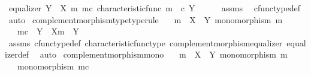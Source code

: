 \begin{isabellebody}
\ {\isachardoublequoteopen}equalizer\ {\isacharparenleft}{\kern0pt}Y\ {\isasymsetminus}\ {\isacharparenleft}{\kern0pt}X{\isacharcomma}{\kern0pt}\ m{\isacharparenright}{\kern0pt}{\isacharparenright}{\kern0pt}\ m\isactrlsup c\ {\isacharparenleft}{\kern0pt}characteristic{\isacharunderscore}{\kern0pt}func\ m{\isacharparenright}{\kern0pt}\ {\isacharparenleft}{\kern0pt}{\isasymf}\ {\isasymcirc}\isactrlsub c\ {\isasymbeta}\isactrlbsub Y\isactrlesub {\isacharparenright}{\kern0pt}{\isachardoublequoteclose}\isanewline
\ \ \ \ \isamarkupfalse%
\ assms\ \isamarkupfalse%
\ cfunc{\isacharunderscore}{\kern0pt}type{\isacharunderscore}{\kern0pt}def\ \isamarkupfalse%
\ auto\isanewline
{}\isamarkupfalse%
%
\endisatagproof
{\isafoldproof}%
%
\isadelimproof
\isanewline
%
\endisadelimproof
\isanewline
{}\isamarkupfalse%
\ complement{\isacharunderscore}{\kern0pt}morphism{\isacharunderscore}{\kern0pt}type{\isacharbrackleft}{\kern0pt}type{\isacharunderscore}{\kern0pt}rule{\isacharbrackright}{\kern0pt}{\isacharcolon}{\kern0pt}\isanewline
\ \ \ {\isachardoublequoteopen}m\ {\isacharcolon}{\kern0pt}\ X\ {\isasymrightarrow}\ Y{\isachardoublequoteclose}\ {\isachardoublequoteopen}monomorphism\ m{\isachardoublequoteclose}\isanewline
\ \ \ {\isachardoublequoteopen}m\isactrlsup c\ {\isacharcolon}{\kern0pt}\ Y\ {\isasymsetminus}\ {\isacharparenleft}{\kern0pt}X{\isacharcomma}{\kern0pt}m{\isacharparenright}{\kern0pt}\ {\isasymrightarrow}\ Y{\isachardoublequoteclose}\isanewline
%
\isadelimproof
\ \ %
\endisadelimproof
%
\isatagproof
{}\isamarkupfalse%
\ assms\ cfunc{\isacharunderscore}{\kern0pt}type{\isacharunderscore}{\kern0pt}def\ characteristic{\isacharunderscore}{\kern0pt}func{\isacharunderscore}{\kern0pt}type\ complement{\isacharunderscore}{\kern0pt}morphism{\isacharunderscore}{\kern0pt}equalizer\ equalizer{\isacharunderscore}{\kern0pt}def\ \isamarkupfalse%
\ auto%
\endisatagproof
{\isafoldproof}%
%
\isadelimproof
\isanewline
%
\endisadelimproof
\isanewline
{}\isamarkupfalse%
\ complement{\isacharunderscore}{\kern0pt}morphism{\isacharunderscore}{\kern0pt}mono{\isacharcolon}{\kern0pt}\isanewline
\ \ \ {\isachardoublequoteopen}m\ {\isacharcolon}{\kern0pt}\ X\ {\isasymrightarrow}\ Y{\isachardoublequoteclose}\ {\isachardoublequoteopen}monomorphism\ m{\isachardoublequoteclose}\isanewline
\ \ \ {\isachardoublequoteopen}monomorphism\ m\isactrlsup c{\isachardoublequoteclose}\isanewline
%
\isadelimproof

\end{isabellebody}
